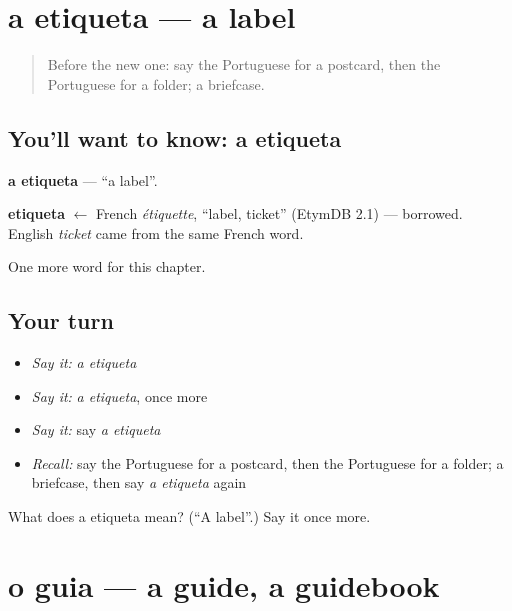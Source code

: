 \section[a etiqueta]{a etiqueta — a label}

\label{lesson:PT-C193-etiqueta}



\begin{quote}
Before the new one: say the Portuguese for a postcard, then the Portuguese for a folder; a briefcase.
\end{quote}

\subsection*{You'll want to know: a etiqueta}
\textbf{a etiqueta} — \textquotedblleft{}a label\textquotedblright{}.

\begin{cousinweb}
\textbf{etiqueta} $\leftarrow$ French \emph{étiquette}, \textquotedblleft{}label, ticket\textquotedblright{} (EtymDB 2.1) — borrowed. English \emph{ticket} came from the same French word.
\end{cousinweb}

\begin{grammarlens}[title={What you've built}]
One more word for this chapter.
\end{grammarlens}

\subsection*{Your turn}
\begin{itemize}
\raggedright
  \item \emph{Say it:} \emph{a etiqueta}
  \item \emph{Say it:} \emph{a etiqueta}, once more
  \item \emph{Say it:} say \emph{a etiqueta}
  \item \emph{Recall:} say the Portuguese for a postcard, then the Portuguese for a folder; a briefcase, then say \emph{a etiqueta} again
\end{itemize}

\begin{tcolorbox}[breakable,colback=teal!4,colframe=teal!35!black,title={Before you move on}]
What does a etiqueta mean? (\textquotedblleft{}A label\textquotedblright{}.) Say it once more.
\end{tcolorbox}
\section[o guia]{o guia — a guide, a guidebook}

